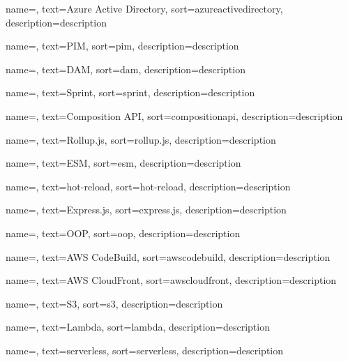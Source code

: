  {
    name=,
    text=Azure Active Directory,
    sort=azureactivedirectory,
    description={description}
}

 {
    name=,
    text=PIM,
    sort=pim,
    description={description}
}

 {
    name=,
    text=DAM,
    sort=dam,
    description={description}
}


 {
    name=,
    text=Sprint,
    sort=sprint,
    description={description}
}

 {
    name=,
    text=Composition API,
    sort=compositionapi,
    description={description}
}

 {
    name=,
    text=Rollup.js,
    sort=rollup.js,
    description={description}
}

 {
    name=,
    text=ESM,
    sort=esm,
    description={description}
}

 {
    name=,
    text=hot-reload,
    sort=hot-reload,
    description={description}
}

 {
    name=,
    text=Express.js,
    sort=express.js,
    description={description}
}

 {
    name=,
    text=OOP,
    sort=oop,
    description={description}
}

 {
    name=,
    text=AWS CodeBuild,
    sort=awscodebuild,
    description={description}
}

 {
    name=,
    text=AWS CloudFront,
    sort=awscloudfront,
    description={description}
}

 {
    name=,
    text=S3,
    sort=s3,
    description={description}
}

 {
    name=,
    text=Lambda,
    sort=lambda,
    description={description}
}

 {
    name=,
    text=serverless,
    sort=serverless,
    description={description}
}

